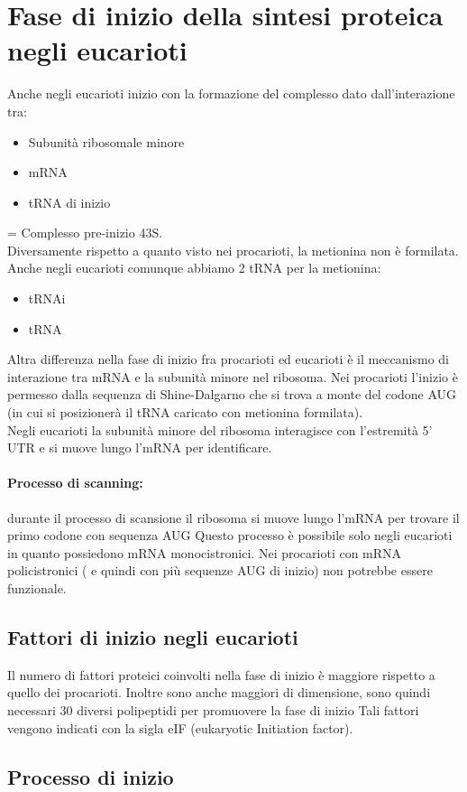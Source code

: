 \documentclass{article}
\begin{document}
\section{Fase di inizio della sintesi proteica negli eucarioti}
Anche negli eucarioti inizio con la formazione del complesso dato dall'interazione tra:
\begin{itemize}
    \item Subunità ribosomale minore
    \item mRNA
    \item tRNA di inizio
\end{itemize}
= Complesso pre-inizio 43S.\\
Diversamente rispetto a quanto visto nei procarioti, la metionina non è formilata. Anche negli eucarioti comunque abbiamo 2 tRNA per la metionina:
\begin{itemize}
    \item tRNAi
    \item tRNA 
\end{itemize}
Altra differenza nella fase di inizio fra procarioti ed eucarioti è il meccanismo di interazione tra mRNA e la subunità
minore nel ribosoma. Nei procarioti l'inizio è permesso dalla sequenza di Shine-Dalgarno che si trova a monte del codone AUG (in
cui si posizionerà il tRNA caricato con metionina formilata).\\
Negli eucarioti la subunità minore del ribosoma interagisce con l'estremità 5' UTR e si muove lungo l'mRNA per identificare.
\paragraph{Processo di scanning:}
durante il processo di scansione il ribosoma si muove
lungo l'mRNA per trovare il primo codone con sequenza AUG
Questo processo è possibile solo negli eucarioti in quanto
possiedono mRNA monocistronici. Nei procarioti con mRNA policistronici ( e quindi con più sequenze AUG di inizio) non potrebbe essere funzionale.
\subsection{Fattori di inizio negli eucarioti}
Il numero di fattori proteici coinvolti nella fase di inizio è maggiore rispetto a quello dei procarioti. Inoltre sono anche maggiori di dimensione, sono quindi necessari 30 diversi polipeptidi per promuovere la fase di inizio
Tali fattori vengono indicati con la sigla eIF (eukaryotic Initiation factor). 
\subsection{Processo di inizio}
\end{document}
